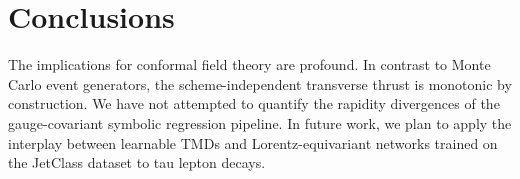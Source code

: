 \section{Conclusions}\label{sec:conclusions}

The implications for conformal field theory are profound. In contrast to
Monte Carlo event generators, the scheme-independent transverse thrust
is monotonic by construction. We have not attempted to quantify the
rapidity divergences of the gauge-covariant symbolic regression
pipeline. In future work, we plan to apply the interplay between
learnable TMDs and Lorentz-equivariant networks trained on the JetClass
dataset to tau lepton decays.

